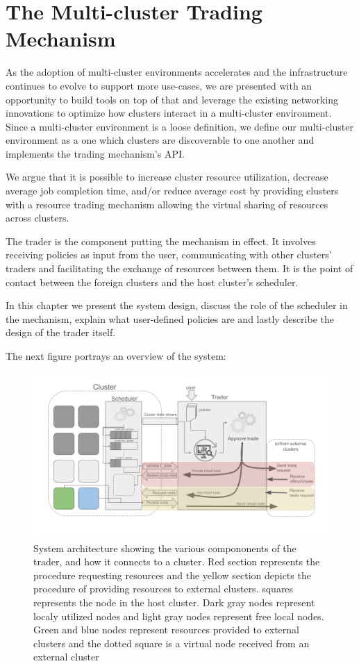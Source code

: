 
\chapter{The Multi-cluster Trading Mechanism}

As the adoption of multi-cluster environments accelerates and the
infrastructure continues to evolve to support more use-cases, we are presented
with an opportunity to build tools on top of that and leverage the existing
networking innovations to optimize how clusters interact in a multi-cluster
environment. Since a multi-cluster environment is a loose definition, we define
our multi-cluster environment as a one which clusters are discoverable to one
another and implements the trading mechanism's API.

We argue that it is possible to increase cluster resource utilization,
decrease average job completion time, and/or reduce average cost by providing
clusters with a resource trading mechanism allowing the virtual sharing of
resources across clusters. 

The trader is the component putting the mechanism in effect. It involves
receiving policies as input from the user, communicating with other clusters'
traders and facilitating the exchange of resources between them. It is the
point of contact between the foreign clusters and the host cluster's scheduler.

In this chapter we present the system design, discuss the role of the scheduler
in the mechanism, explain what user-defined policies are and lastly describe
the design of the trader itself. 

The next figure portrays an overview of the system:

\begin{figure}[H]
  \centerline{\includegraphics[scale=0.45]{figures/system-diagram}}
  \caption{System architecture showing the various compononents of the trader,
    and how it connects to a cluster. Red section represents the procedure
    requesting resources and the yellow section depicts the procedure of
    providing resources to external clusters. squares represents the node in
    the host cluster. Dark gray nodes represent localy utilized nodes and light
    gray nodes represent free local nodes. Green and blue nodes represent
    resources    provided to external clusters and the dotted square is a
    virtual node received from an external cluster} 
  \end{figure}


